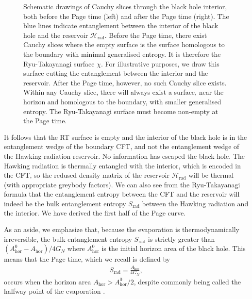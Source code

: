\documentclass[12pt]{article}
\newcommand{\Srad}{S_\text{rad} }
\begin{document}
\begin{figure}[t]
\begin{subfigure}{.48\textwidth}
\end{subfigure}
\centering
\caption{Schematic drawings of Cauchy slices through  the black hole interior, both before the Page time (left) and after the Page time (right). The blue lines indicate entanglement between the interior of the black hole and the reservoir $\mathcal{H}_\text{rad}$. Before the Page time, there exist Cauchy slices where the empty surface is the surface homologous to the boundary with minimal generalised entropy. It is therefore the Ryu-Takayanagi surface $\chi$. For illustrative purposes, we draw this surface cutting the entanglement between the interior and the reservoir. After the Page time, however, no such Cauchy slice exists. Within any Cauchy slice, there will always exist a surface, near the horizon and homologous to the boundary, with smaller generalised entropy. The Ryu-Takayanagi surface must become non-empty at the Page time.}
\label{fig:schematic}
\end{figure}

It follows that the RT surface is empty and the interior of the black hole is in the entanglement wedge of the boundary CFT, and not the entanglement wedge of the Hawking radiation reservoir. No information has escaped the black hole. The Hawking radiation is thermally entangled with the interior, which is encoded in the CFT, so the redused density matrix of the reservoir $\mathcal{H}_\text{rad}$ will be thermal (with appropriate greybody factors). We can also see from the Ryu-Takayanagi formula that the entanglement entropy between the CFT and the reservoir will indeed be the bulk entanglement entropy $\Srad$ between the Hawking radiation and the interior. We have derived the first half of the Page curve.

As an aside, we emphasize that, because the evaporation is thermodynamically irreversible, the bulk entanglement entropy $\Srad$ is strictly greater than $(A_\text{hor}^0 -  A_\text{hor})/ 4G_N$ where $A_\text{hor}^0$ is the initial horizon area of the black hole. This means that the Page time, which we recall is defined by 
\begin{align}
\Srad = \frac{A_\text{hor}} {4G_N},
\end{align}
occurs when the horizon area $A_\text{hor} > A_\text{hor}^0 /2$, despite commonly being called the halfway point of the evaporation \cite{page2013time}.
\end{document}
